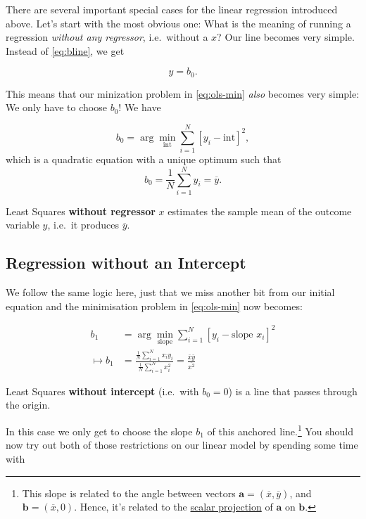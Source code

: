 \documentclass[]{book}
\newenvironment{tip}{\begin{tcolorbox}[colback=green!5!white,colframe=green]}{\end{tcolorbox}}
\begin{document}
There are several important special cases for the linear regression introduced above. Let's start with the most obvious one: What is the meaning of running a regression \emph{without any regressor}, i.e.~without a \(x\)? Our line becomes very simple. Instead of \eqref{eq:bline}, we get

\begin{equation}
y = b_0. \label{eq:b0line}
\end{equation}

This means that our minization problem in \eqref{eq:ols-min} \emph{also} becomes very simple: We only have to choose \(b_0\)! We have

\[
b_0 = \arg\min_{\text{int}} \sum_{i=1}^N \left[y_i - \text{int}\right]^2,
\]
which is a quadratic equation with a unique optimum such that
\[
b_0 = \frac{1}{N} \sum_{i=1}^N y_i = \overline{y}.
\]

\begin{tip}
Least Squares \textbf{without regressor} \(x\) estimates the sample mean
of the outcome variable \(y\), i.e.~it produces \(\overline{y}\).
\end{tip}

\hypertarget{regression-without-an-intercept}{%
\subsection{Regression without an Intercept}\label{regression-without-an-intercept}}

We follow the same logic here, just that we miss another bit from our initial equation and the minimisation problem in \eqref{eq:ols-min} now becomes:

\begin{align}
b_1 &= \arg\min_{\text{slope}} \sum_{i=1}^N \left[y_i - \text{slope } x_i \right]^2\\
\mapsto b_1 &= \frac{\frac{1}{N}\sum_{i=1}^N x_i y_i}{\frac{1}{N}\sum_{i=1}^N x_i^2} = \frac{\bar{x} \bar{y}}{\overline{x^2}} \label{eq:b1line}
\end{align}

\begin{tip}
Least Squares \textbf{without intercept} (i.e.~with \(b_0=0\)) is a line
that passes through the origin.
\end{tip}

In this case we only get to choose the slope \(b_1\) of this anchored line.\footnote{This slope is related to the angle between vectors \(\mathbf{a} = (\overline{x},\overline{y})\), and \(\mathbf{b} = (\overline{x},0)\). Hence, it's related to the \href{https://en.wikipedia.org/wiki/Scalar_projection}{scalar projection} of \(\mathbf{a}\) on \(\mathbf{b}\).} You should now try out both of those restrictions on our linear model by spending some time with
\end{document}
